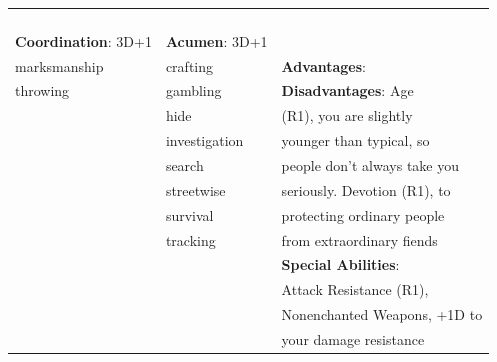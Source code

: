 \documentclass[10pt]{article}
\begin{document}
\begin{table}
\begin{tabular}{m{156pt} m{156pt} m{156pt}}
 \hrulefill &  \hrulefill & \\

 \hrulefill &  \hrulefill & \\

 \hrulefill &  \hrulefill & \\

 \hrulefill &  \hrulefill & \\


\textbf{Coordination}: 3D+1 \hrulefill & \textbf{Acumen}: 3D+1 \hrulefill     & \hrulefill \\

marksmanship         \hrulefill & crafting             \hrulefill & \textbf{Advantages}: \hrulefill \\

throwing             \hrulefill & gambling             \hrulefill & \textbf{Disadvantages}: Age \hrulefill \\

 \hrulefill & hide                 \hrulefill & (R1), you are slightly \hrulefill \\

 \hrulefill & investigation        \hrulefill & younger than typical, so \hrulefill \\

 \hrulefill & search               \hrulefill & people don't always take you \hrulefill \\

 \hrulefill & streetwise           \hrulefill & seriously. Devotion (R1), to \hrulefill \\

 \hrulefill & survival             \hrulefill & protecting ordinary people \hrulefill \\

 \hrulefill & tracking             \hrulefill & from extraordinary fiends \hrulefill \\

 \hrulefill &  \hrulefill & \textbf{Special Abilities}: \hrulefill \\

 \hrulefill &  \hrulefill & Attack Resistance (R1), \hrulefill \\

 \hrulefill &  \hrulefill & Nonenchanted Weapons, +1D to \hrulefill \\

 \hrulefill &  \hrulefill & your damage resistance \hrulefill \\


\end{tabular}
\end{table}
\end{document}
